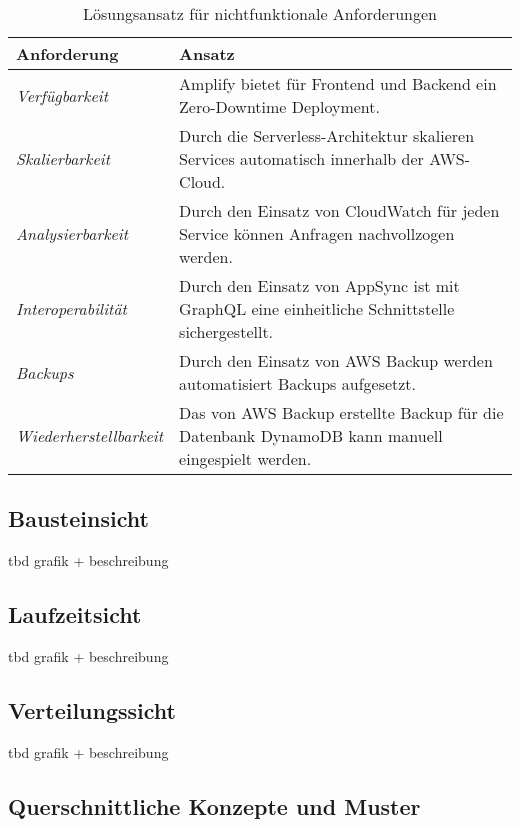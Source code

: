 \begin{table}[h]
  \caption{Lösungsansatz für nichtfunktionale Anforderungen}
  \label{Kap2:Teildisziplinen}
  \renewcommand{\arraystretch}{1.2}
  \centering
  \sffamily
  \begin{footnotesize}
    \begin{tabularx}{0.9\textwidth}{l X}
      \toprule
      \textbf{Anforderung} & \textbf{Ansatz}\\
      \midrule
        \emph{Verfügbarkeit} & Amplify bietet für Frontend und Backend ein Zero-Downtime Deployment. \\
        \emph{Skalierbarkeit} & Durch die Serverless-Architektur skalieren Services automatisch innerhalb der \ac{AWS}-Cloud.\\
        \emph{Analysierbarkeit} & Durch den Einsatz von CloudWatch für jeden Service können Anfragen nachvollzogen werden.\\
        \emph{Interoperabilität} & Durch den Einsatz von AppSync ist mit GraphQL eine einheitliche Schnittstelle sichergestellt.\\
        \emph{Backups} & Durch den Einsatz von AWS Backup werden automatisiert Backups aufgesetzt.\\
        \emph{Wiederherstellbarkeit} & Das von AWS Backup erstellte Backup für die Datenbank DynamoDB kann manuell eingespielt werden.\\
      \bottomrule
    \end{tabularx}
  \end{footnotesize}
  \rmfamily
\end{table}

\subsection{Bausteinsicht}

tbd grafik + beschreibung

\subsection{Laufzeitsicht}

tbd grafik + beschreibung

\subsection{Verteilungssicht}

tbd grafik + beschreibung

\subsection{Querschnittliche Konzepte und Muster}

